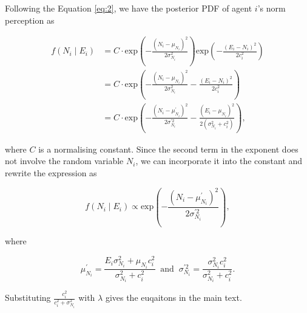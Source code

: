 \documentclass[
  11pt,
]{article}
\begin{document}
Following the Equation \ref{eq:2}, we have the posterior PDF of agent
\(i\)'s norm perception as

\begin{equation*}
  \begin{aligned}
    f(N_i \mid E_i) &= C \cdot \text{exp}(-\frac{(N_i - \mu_{N_i})^2}{2\sigma_{N_i}^2}) \text{exp}(- \frac{(E_i - N_i)^2}{2c_i^2})\\
      &= C \cdot \text{exp}(-\frac{(N_i - \mu_{N_i})^2}{2\sigma_{N_i}^2} - \frac{(E_i - N_i)^2}{2c_i^2})\\
      &= C \cdot \text{exp}(- \frac{(N_i - \mu_{N_i}^{\prime})^2}{2\sigma_{N_i}^{\prime2}} - \frac{(E_i - \mu_{N_i})^2}{2(\sigma_{N_i}^2 + c_i^2)}),
  \end{aligned}
\end{equation*}

where \(C\) is a normalising constant. Since the second term in the
exponent does not involve the random variable \(N_i\), we can
incorporate it into the constant and rewrite the expression as

\begin{equation*}
  f(N_i \mid E_i) \propto \text{exp}(- \frac{(N_i - \mu_{N_i}^{\prime})^2}{2\sigma_{N_i}^{\prime2}}),
\end{equation*}

where

\begin{equation*}
  \mu_{N_i}^{\prime} = \frac{E_i \sigma_{N_i}^2 + \mu_{N_i} c_i^2}{\sigma_{N_i}^2 + c_i^2} \;\; \text{and} \;\; \sigma_{N_i}^{\prime2} = \frac{\sigma_{N_i}^2 c_i^2}{\sigma_{N_i}^2 + c_i^2}.
\end{equation*}

Substituting \(\frac{c_i^2}{c_i^2 + \sigma_{N_i}^2}\) with \(\lambda\)
gives the euqaitons in the main text.
\end{document}
